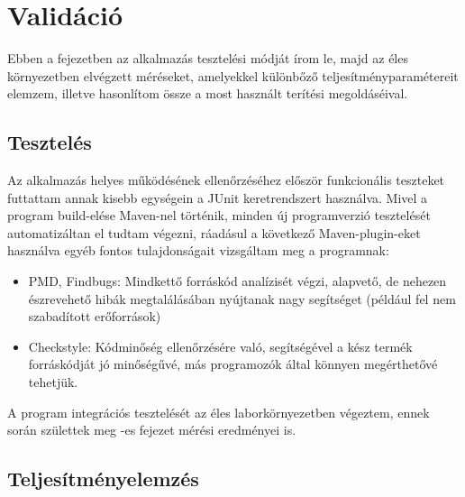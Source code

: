 \chapter{Validáció}
\label{chp:validation}

Ebben a fejezetben az alkalmazás tesztelési módját írom le, majd az éles környezetben elvégzett méréseket, amelyekkel különbőző teljesítményparamétereit elemzem, illetve hasonlítom össze a most használt terítési megoldáséival.

\section{Tesztelés}

Az alkalmazás helyes működésének ellenőrzéséhez először funkcionális teszteket futtattam annak kisebb egységein a JUnit\cite{massol2003junit} keretrendszert használva. Mivel a program build-elése Maven-nel\cite{smart2005introduction} történik, minden új programverzió tesztelését automatizáltan el tudtam végezni, ráadásul a következő Maven-plugin-eket használva egyéb fontos tulajdonságait vizsgáltam meg a programnak:

\begin{itemize}
  \item PMD, Findbugs\cite{rutar2004comparison}: Mindkettő forráskód analízisét végzi, alapvető, de nehezen észrevehető hibák megtalálásában nyújtanak nagy segítséget (például fel nem szabadított erőforrások)
  \item Checkstyle\cite{checkstyle}: Kódminőség ellenőrzésére való, segítségével a kész termék forráskódját jó minőségűvé, más programozók által könnyen megérthetővé tehetjük.
\end{itemize}

A program integrációs tesztelését az éles laborkörnyezetben végeztem, ennek során születtek meg -es fejezet mérési eredményei is.

\section{Teljesítményelemzés}
\label{performanceanal}

